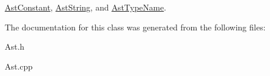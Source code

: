 \hyperlink{classAstConstant_ac13b7246f9d646a5ff00efee4c39bc6b}{Ast\-Constant}, \hyperlink{classAstString_a0a7a6576cf72bfbcd2f78c7ffb9350bb}{Ast\-String}, and \hyperlink{classAstTypeName_adcd2b22b4135cadd7b9117e25a5dff45}{Ast\-Type\-Name}.



The documentation for this class was generated from the following files\-:\begin{DoxyCompactItemize}
\item 
Ast.\-h\item 
Ast.\-cpp\end{DoxyCompactItemize}
